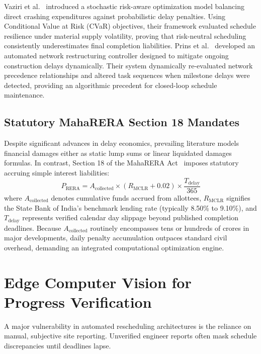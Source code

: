 \documentclass[conference]{IEEEtran}
\begin{document}
Vaziri et al.~\cite{vaziri2024stochastic} introduced a stochastic risk-aware optimization model balancing direct crashing expenditures against probabilistic delay penalties. Using Conditional Value at Risk (CVaR) objectives, their framework evaluated schedule resilience under material supply volatility, proving that risk-neutral scheduling consistently underestimates final completion liabilities. Prins et al.~\cite{prins2022mitigate} developed an automated network restructuring controller designed to mitigate ongoing construction delays dynamically. Their system dynamically re-evaluated network precedence relationships and altered task sequences when milestone delays were detected, providing an algorithmic precedent for closed-loop schedule maintenance.

\subsection{Statutory MahaRERA Section 18 Mandates}
Despite significant advances in delay economics, prevailing literature models financial damages either as static lump sums or linear liquidated damages formulas. In contrast, Section 18 of the MahaRERA Act~\cite{maharera2016act} imposes statutory accruing simple interest liabilities:
\begin{equation}
P_{\text{RERA}} = A_{\text{collected}} \times (R_{\text{MCLR}} + 0.02) \times \frac{T_{\text{delay}}}{365}
\end{equation}
where $A_{\text{collected}}$ denotes cumulative funds accrued from allottees, $R_{\text{MCLR}}$ signifies the State Bank of India's benchmark lending rate (typically 8.50\% to 9.10\%), and $T_{\text{delay}}$ represents verified calendar day slippage beyond published completion deadlines. Because $A_{\text{collected}}$ routinely encompasses tens or hundreds of crores in major developments, daily penalty accumulation outpaces standard civil overhead, demanding an integrated computational optimization engine.

\section{Edge Computer Vision for Progress Verification}

A major vulnerability in automated rescheduling architectures is the reliance on manual, subjective site reporting. Unverified engineer reports often mask schedule discrepancies until deadlines lapse.
\end{document}
